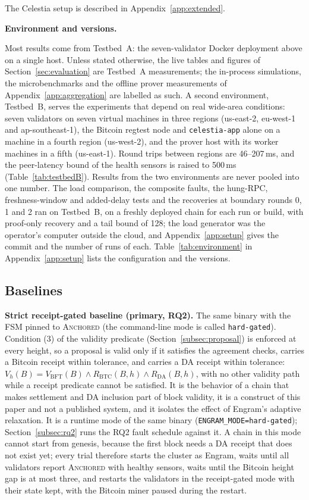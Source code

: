 The Celestia setup is described in Appendix~\ref{app:extended}.

\textbf{Environment and versions.}\label{subsec:environment}

Most results come from Testbed~A: the seven-validator Docker
deployment above on a single host. Unless stated otherwise, the live
tables and figures of Section~\ref{sec:evaluation} are Testbed~A measurements; the
in-process simulations, the microbenchmarks and the offline prover measurements of
Appendix~\ref{app:aggregation} are labelled as such.
\iftestbedB A second environment, Testbed~B, serves the experiments that depend on real
wide-area conditions: seven validators on seven virtual machines in three regions
(us-east-2, eu-west-1 and ap-southeast-1), the Bitcoin regtest node and
\texttt{celestia-app} alone on a machine in a fourth region (us-west-2), and the
prover host with its worker machines in a fifth (us-east-1). Round trips between
regions are 46--207\,ms, and the peer-latency bound of the health sensors is raised to 500\,ms
(Table~\ref{tab:testbedB}). Results from the two environments are never pooled into
one number. The load comparison, the composite faults, the hung-RPC, freshness-window and added-delay tests and the recoveries at boundary rounds 0, 1 and 2 ran on Testbed~B, on a freshly deployed chain for each run or build, with proof-only recovery and a tail bound of 128; the load generator was the operator's computer outside the cloud, and Appendix~\ref{app:setup} gives the commit and the number of runs of each.\fi{}
Table~\ref{tab:environment} in Appendix~\ref{app:setup} lists the configuration and the versions.


\subsection{Baselines}
\label{subsec:baselines}

\textbf{Strict receipt-gated baseline (primary, RQ2).} The same binary with the
FSM pinned to \textsc{Anchored} (the command-line mode is called
\texttt{hard-gated}). Condition (3) of the validity predicate
(Section~\ref{subsec:proposal}) is enforced at every height, so a proposal is
valid only if it satisfies the agreement checks, carries a Bitcoin receipt within
tolerance, and carries a DA receipt within tolerance:
$V_h(B) = V_{\mathrm{BFT}}(B) \wedge R_{\mathrm{BTC}}(B,h) \wedge R_{\mathrm{DA}}(B,h)$,
with no other validity path while a receipt predicate cannot be satisfied. It is
the behavior of a chain that makes settlement and DA inclusion part of block
validity, it is a construct of this paper and not a published system, and it
isolates the effect of Engram's adaptive relaxation. It is a runtime mode of
the same binary (\texttt{ENGRAM\_MODE=hard-gated}); Section~\ref{subsec:rq2} runs
the RQ2 fault schedule against it. A chain in this mode cannot start from genesis, because the first block needs a DA receipt that does not exist yet; every trial therefore starts the cluster as Engram, waits until all validators report \textsc{Anchored} with healthy sensors, waits until the Bitcoin height gap is at most three, and restarts the validators in the receipt-gated mode with their state kept, with the Bitcoin miner paused during the restart.

